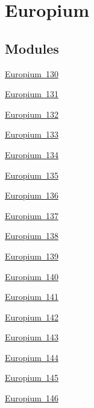 \hypertarget{group___isotope_const-_europium}{}\section{Europium}
\label{group___isotope_const-_europium}
\subsection*{Modules}
\begin{DoxyCompactItemize}
\item 
\mbox{\hyperlink{group___isotope_const-_europium-_eu130}{Europium 130}}
\item 
\mbox{\hyperlink{group___isotope_const-_europium-_eu131}{Europium 131}}
\item 
\mbox{\hyperlink{group___isotope_const-_europium-_eu132}{Europium 132}}
\item 
\mbox{\hyperlink{group___isotope_const-_europium-_eu133}{Europium 133}}
\item 
\mbox{\hyperlink{group___isotope_const-_europium-_eu134}{Europium 134}}
\item 
\mbox{\hyperlink{group___isotope_const-_europium-_eu135}{Europium 135}}
\item 
\mbox{\hyperlink{group___isotope_const-_europium-_eu136}{Europium 136}}
\item 
\mbox{\hyperlink{group___isotope_const-_europium-_eu137}{Europium 137}}
\item 
\mbox{\hyperlink{group___isotope_const-_europium-_eu138}{Europium 138}}
\item 
\mbox{\hyperlink{group___isotope_const-_europium-_eu139}{Europium 139}}
\item 
\mbox{\hyperlink{group___isotope_const-_europium-_eu140}{Europium 140}}
\item 
\mbox{\hyperlink{group___isotope_const-_europium-_eu141}{Europium 141}}
\item 
\mbox{\hyperlink{group___isotope_const-_europium-_eu142}{Europium 142}}
\item 
\mbox{\hyperlink{group___isotope_const-_europium-_eu143}{Europium 143}}
\item 
\mbox{\hyperlink{group___isotope_const-_europium-_eu144}{Europium 144}}
\item 
\mbox{\hyperlink{group___isotope_const-_europium-_eu145}{Europium 145}}
\item 
\mbox{\hyperlink{group___isotope_const-_europium-_eu146}{Europium 146}}
\item 

\end{DoxyCompactItemize}

